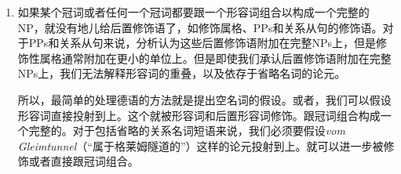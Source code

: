 \begin{enumerate}
\item 如果某个冠词或者任何一个冠词都要跟一个形容词组合以构成一个完整的NP，就没有地儿给后置修饰语了，如修饰属格、PPs和关系从句的修饰语。对于PPs和关系从句来说，分析认为这些后置修饰语附加在完整NPs上\citep{Kiss2005a}，但是修饰性属格通常附加在更小的单位上。但是即使我们承认后置修饰语附加在完整NPs上，我们无法解释形容词的重叠，以及依存于省略名词的论元。
 
所以，最简单的处理德语的方法就是提出空名词的假设。或者，我们可以假设形容词直接投射到\nbar 上。这个\nbar 就被形容词和后置形容词修饰。跟冠词组合构成一个完整的\nbar 。对于包括省略的关系名词短语来说，我们必须要假设\emph{vom Gleimtunnel}（“属于格莱姆隧道的”）这样的论元投射到\nbar 上。\nbar 就可以进一步被修饰或者直接跟冠词组合。


\end{enumerate}
